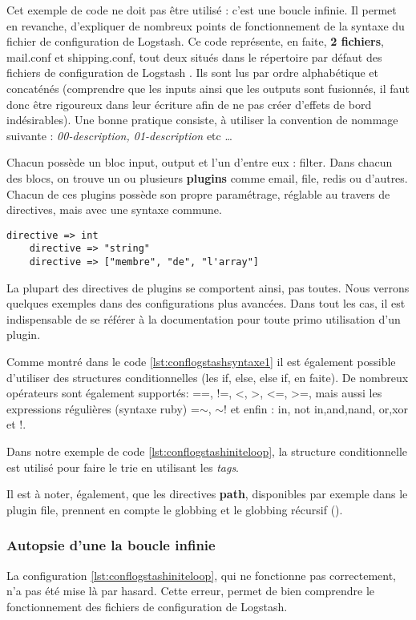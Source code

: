 Cet exemple de code ne doit pas être utilisé : c'est une boucle infinie.
Il permet en revanche, d'expliquer de nombreux points de fonctionnement de la syntaxe
du fichier de configuration de Logstash.
Ce code représente, en faite, {\bfseries 2 fichiers}, mail.conf et shipping.conf, tout
deux situés dans le répertoire par défaut des fichiers de configuration de Logstash
. Ils sont lus par ordre alphabétique et concaténés 
(comprendre que les inputs ainsi que les outputs sont fusionnés, il faut donc être
rigoureux dans leur écriture afin de ne pas créer d'effets de bord indésirables).
Une bonne pratique consiste, à utiliser la convention de nommage suivante : \textit{
00-description, 01-description} etc \ldots


Chacun possède un bloc input, output et l'un d'entre eux : filter.
Dans chacun des blocs, on trouve un ou plusieurs {\bfseries plugins} comme email, 
file, redis ou d'autres. 
Chacun de ces plugins possède son propre paramétrage, réglable au travers de 
directives, mais avec une syntaxe commune.


\begin{lstlisting}[style=logstash,label={lst:conflogstashsyntaxe1},caption={Syntaxe}]
    directive => int
    directive => "string"
    directive => ["membre", "de", "l'array"]
\end{lstlisting}

La plupart des directives de plugins se comportent ainsi, pas toutes. Nous
verrons quelques exemples dans des configurations plus avancées. Dans tout les cas, il
est indispensable de se référer à la documentation pour toute primo utilisation d'un
plugin.


Comme montré dans le code \ref{lst:conflogstashsyntaxe1} il est également possible 
d'utiliser des structures conditionnelles (les if, else, else if, en faite).
De nombreux opérateurs sont également supportés: ==, !=, <, >, <=, >=, mais aussi
les expressions régulières (syntaxe ruby) =$\sim$, $\sim$! et enfin : in, not in,and,nand,
or,xor et !. 

Dans notre exemple de code \ref{lst:conflogstashiniteloop}, la structure conditionnelle
est utilisé pour faire le trie en utilisant les \emph{tags}.

Il est à noter, également, que les directives \textbf{path}, disponibles par exemple dans
le plugin file, prennent en compte le globbing et le globbing récursif 
().

\subsubsection{Autopsie d'une la boucle infinie}
La configuration \ref{lst:conflogstashiniteloop}, qui ne fonctionne pas
correctement, n'a pas été mise là par hasard. Cette erreur, permet de bien comprendre 
le fonctionnement des fichiers de configuration de Logstash.

